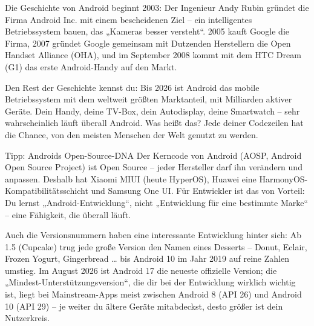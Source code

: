 


Die Geschichte von Android beginnt 2003: Der Ingenieur Andy Rubin gründet die Firma Android Inc. mit einem bescheidenen Ziel – ein intelligentes Betriebssystem bauen, das „Kameras besser versteht“. 2005 kauft Google die Firma, 2007 gründet Google gemeinsam mit Dutzenden Herstellern die Open Handset Alliance (OHA), und im September 2008 kommt mit dem HTC Dream (G1) das erste Android-Handy auf den Markt.

Den Rest der Geschichte kennst du: Bis 2026 ist Android das mobile Betriebssystem mit dem weltweit größten Marktanteil, mit Milliarden aktiver Geräte. Dein Handy, deine TV-Box, dein Autodisplay, deine Smartwatch – sehr wahrscheinlich läuft überall Android. Was heißt das? Jede deiner Codezeilen hat die Chance, von den meisten Menschen der Welt genutzt zu werden.

\begin{tcbinfo}{Tipp: Androids Open-Source-DNA}
Der Kerncode von Android (AOSP, Android Open Source Project) ist Open Source – jeder Hersteller darf ihn verändern und anpassen. Deshalb hat Xiaomi MIUI (heute HyperOS), Huawei eine HarmonyOS-Kompatibilitätsschicht und Samsung One UI. Für Entwickler ist das von Vorteil: Du lernst „Android-Entwicklung“, nicht „Entwicklung für eine bestimmte Marke“ – eine Fähigkeit, die überall läuft.

\end{tcbinfo}

Auch die Versionsnummern haben eine interessante Entwicklung hinter sich: Ab 1.5 (Cupcake) trug jede große Version den Namen eines Desserts – Donut, Eclair, Frozen Yogurt, Gingerbread … bis Android 10 im Jahr 2019 auf reine Zahlen umstieg. Im August 2026 ist Android 17 die neueste offizielle Version; die „Mindest-Unterstützungsversion“, die dir bei der Entwicklung wirklich wichtig ist, liegt bei Mainstream-Apps meist zwischen Android 8 (API 26) und Android 10 (API 29) – je weiter du ältere Geräte mitabdeckst, desto größer ist dein Nutzerkreis.

